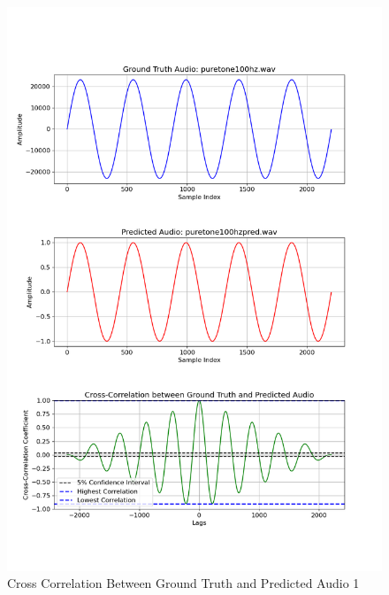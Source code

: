 \documentclass{ioereport}
\begin{document}
    \begin{figure}[H]
        \centering
        \includegraphics[width=\linewidth]{assets/crosscorrelation/cross_correlation_puretone100hz.wav_puretone100hzpred.wav.png}
        \caption{Cross Correlation Between Ground Truth and Predicted Audio 1}
        \label{fig:cross-correlation-1}
    \end{figure}
\end{document}
